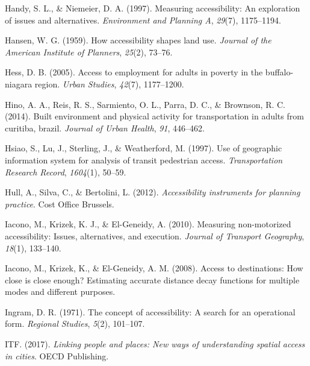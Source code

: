 \documentclass[
11pt, %
oneside, %
english, %
singlespacing, %
]{macthesis} %
\newlength{\cslhangindent}
\newenvironment{CSLReferences}[2] %
 {%
  \setlength{\parindent}{0pt}
  \ifodd #1 \everypar{\setlength{\hangindent}{\cslhangindent}}\ignorespaces\fi
  \ifnum #2 > 0
  \setlength{\parskip}{#2\baselineskip}
  \fi
 }%
 {}
\begin{document}
\begin{CSLReferences}{1}{0}
\leavevmode{}%
Handy, S. L., \& Niemeier, D. A. (1997). Measuring accessibility: An exploration of issues and alternatives. \emph{Environment and Planning A}, \emph{29}(7), 1175--1194.

\leavevmode{}%
Hansen, W. G. (1959). How accessibility shapes land use. \emph{Journal of the American Institute of Planners}, \emph{25}(2), 73--76.

\leavevmode{}%
Hess, D. B. (2005). Access to employment for adults in poverty in the buffalo-niagara region. \emph{Urban Studies}, \emph{42}(7), 1177--1200.

\leavevmode{}%
Hino, A. A., Reis, R. S., Sarmiento, O. L., Parra, D. C., \& Brownson, R. C. (2014). Built environment and physical activity for transportation in adults from curitiba, brazil. \emph{Journal of Urban Health}, \emph{91}, 446--462.

\leavevmode{}%
Hsiao, S., Lu, J., Sterling, J., \& Weatherford, M. (1997). Use of geographic information system for analysis of transit pedestrian access. \emph{Transportation Research Record}, \emph{1604}(1), 50--59.

\leavevmode{}%
Hull, A., Silva, C., \& Bertolini, L. (2012). \emph{Accessibility instruments for planning practice}. Cost Office Brussels.

\leavevmode{}%
Iacono, M., Krizek, K. J., \& El-Geneidy, A. (2010). Measuring non-motorized accessibility: Issues, alternatives, and execution. \emph{Journal of Transport Geography}, \emph{18}(1), 133--140.

\leavevmode{}%
Iacono, M., Krizek, K., \& El-Geneidy, A. M. (2008). Access to destinations: How close is close enough? Estimating accurate distance decay functions for multiple modes and different purposes.

\leavevmode{}%
Ingram, D. R. (1971). The concept of accessibility: A search for an operational form. \emph{Regional Studies}, \emph{5}(2), 101--107.

\leavevmode{}%
ITF. (2017). \emph{Linking people and places: New ways of understanding spatial access in cities}. OECD Publishing.


\end{CSLReferences}
\end{document}
